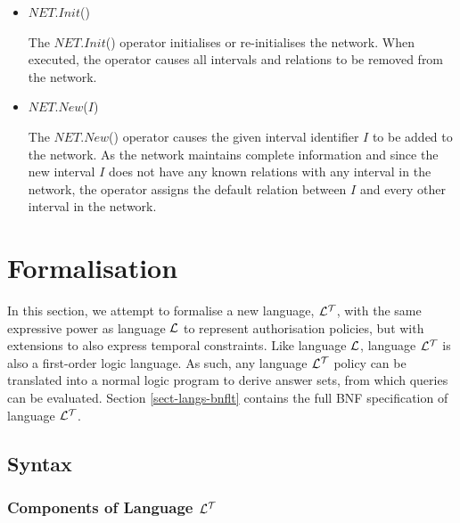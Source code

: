 \documentclass[11pt]{report}
\begin{document}
        \begin{itemize}
          \item
            $NET.Init$()

            The $NET.Init$() operator initialises or re-initialises the
            network. When executed, the operator causes all intervals and
            relations to be removed from the network.

          \item
            $NET.New$($I$)

            The $NET.New$() operator causes the given interval identifier $I$
            to be added to the network. As the network maintains complete
            information and since the new interval $I$ does not have any known
            relations with any interval in the network, the operator assigns
            the default relation between $I$ and every other interval in the
            network.
        \end{itemize}

    \section{Formalisation}
       \label{sect-tempo-fmstn}

      In this section, we attempt to formalise a new language, ${\cal L^T}$,
      with the same expressive power as language ${\cal L}$ to represent
      authorisation policies, but with extensions to also express temporal
      constraints. Like language ${\cal L}$, language ${\cal L^T}$ is also a
      first-order logic language. As such, any language ${\cal L^T}$ policy
      can be translated into a normal logic program to derive answer sets,
      from which queries can be evaluated. Section \ref{sect-langs-bnflt}
      contains the full BNF specification of language ${\cal L^T}$.

      \subsection{Syntax}
        \label{subs-tempo-syntx}

        \subsubsection{Components of Language ${\cal L^T}$}
\end{document}
